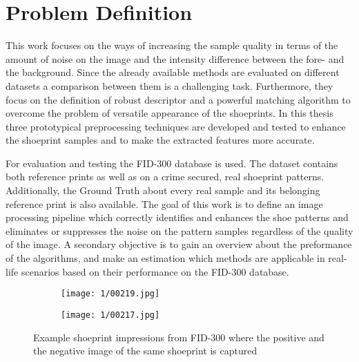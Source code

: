 \documentclass[draft,final]{vutinfth} %
\begin{document}
\section{Problem Definition}
\par
This work focuses on the ways of increasing the sample quality in terms of the amount of noise on the image and the intensity difference between the fore- and the background.
Since the already available methods are evaluated on different datasets a comparison between them is a challenging task.
Furthermore, they focus on the definition of robust descriptor and a powerful matching algorithm to overcome the problem of versatile appearance of the shoeprints.
In this thesis three prototypical preprocessing techniques are developed and tested to enhance the shoeprint samples and to make the extracted features more accurate. 
\par
For evaluation and testing the FID-300 database is used.
The dataset contains both reference prints as well as on a crime secured, real shoeprint patterns.
Additionally, the Ground Truth about every real sample and its belonging reference print is also available.
The goal of this work is to define an image processing pipeline which correctly identifies and enhances the shoe patterns and eliminates or suppresses the noise on the pattern samples regardless of the quality of the image.
A secondary objective is to gain an overview about the preformance of the algorithms, and make an estimation which methods are applicable in real-life scenarios based on their performance on the FID-300 database. 

\begin{figure}[h]
  \centering
  \begin{subfigure}[t]{0.45\columnwidth}
    \centering
    \texttt{[image: 1/00219.jpg]}
	\caption{}
	\label{fig:int:cap:pos}
  \end{subfigure}
  \begin{subfigure}[t]{0.45\columnwidth}
    \centering
    \texttt{[image: 1/00217.jpg]}
	\caption{}
	\label{fig:int:cap:neg}
  \end{subfigure}
  \caption{Example shoeprint impressions from FID-300 where the positive and the negative image of the same shoeprint is captured}
  \label{fig:int:cap}
\end{figure}
\end{document}
